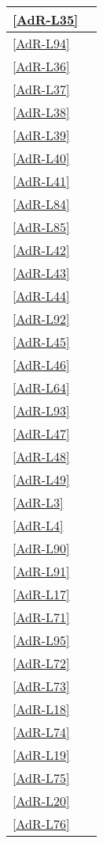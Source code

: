 \begin{longtable}{|P{6cm}|P{6cm}|}
	\hline \ref{AdR-L35} &  \\
	\hline \ref{AdR-L94} &  \linebreak {} \\
	\hline \ref{AdR-L36} &  \\ %
	\hline \ref{AdR-L37} &  \\
	\hline \ref{AdR-L38} &  \\
	\hline \ref{AdR-L39} &  \\
	\hline \ref{AdR-L40} &  \\
	\hline \ref{AdR-L41} &  \\ %
	\hline \ref{AdR-L84} &  \\
	\hline \ref{AdR-L85} &  \\
	\hline \ref{AdR-L42} &  \\
 	\hline \ref{AdR-L43} &  \\
	\hline \ref{AdR-L44} &  \\ %
	\hline \ref{AdR-L92} &  \\
	\hline \ref{AdR-L45} &  \\
	\hline \ref{AdR-L46} &  \\
	\hline \ref{AdR-L64} &  \\
	\hline \ref{AdR-L93} &  \\ %
	\hline \ref{AdR-L47} &  \\
	\hline \ref{AdR-L48} &  \\
	\hline \ref{AdR-L49} &  \\
	\hline \ref{AdR-L3} &  \\
	\hline \ref{AdR-L4} &  \\ %
	\hline \ref{AdR-L90} &  \\
	\hline \ref{AdR-L91} &  \\ %
	
	\hline \ref{AdR-L17} &  \\ %
	\hline \ref{AdR-L71} &  \\ %
	\hline \ref{AdR-L95} &  \\
	\hline \ref{AdR-L72} &  \\
	\hline \ref{AdR-L73} &  \\
	\hline \ref{AdR-L18} &  \\
	\hline \ref{AdR-L74} &  \\ %
	\hline \ref{AdR-L19} &  \\
	\hline \ref{AdR-L75} &  \\
	\hline \ref{AdR-L20} &  \\
	\hline \ref{AdR-L76} &  \\ %
	

\end{longtable}
